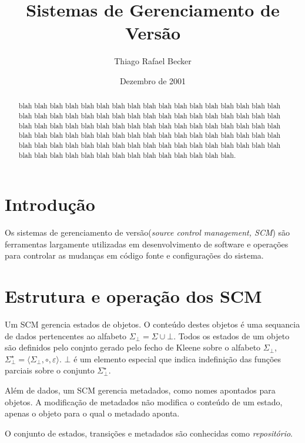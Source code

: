 \documentclass[a4paper]{article}
\title{Sistemas de Gerenciamento de Versão}
\author{Thiago Rafael Becker}
\date{Dezembro de 2001}
\newcommand{\scm}{{sistemas de gerenciamento de versão}}
\newcommand{\baseset}{{\Sigma^\star_\bot}}
\newcommand{\composition}{{\circ}}
\begin{document}
\maketitle
\begin{abstract}
blah blah blah blah blah blah blah blah blah blah blah blah blah blah blah blah
blah blah blah blah blah blah blah blah blah blah blah blah blah blah blah blah
blah blah blah blah blah blah blah blah blah blah blah blah blah blah blah blah
blah blah blah blah blah blah blah blah blah blah blah blah blah blah blah blah
blah blah blah blah blah blah blah blah blah blah blah blah blah blah blah blah
blah blah blah blah blah blah blah blah blah blah blah blah blah blah blah blah
blah blah blah.
\end{abstract}

\section*{Introdução}
Os \scm ({\it source control management, SCM}) são ferramentas largamente
utilizadas em desenvolvimento de software e operações para controlar as mudanças
em código fonte e configurações do sistema. 

\section*{Estrutura e operação dos SCM} \label{sec:intuitiva}
Um SCM gerencia estados de objetos. O conteúdo destes objetos é uma sequancia de dados pertencentes ao alfabeto $\Sigma_\bot = \Sigma \cup \bot$. Todos os estados de um objeto são definidos pelo conjnto gerado pelo fecho de Kleene sobre o alfabeto $\Sigma_\bot$, $\baseset = \langle\Sigma_\bot, \composition, \varepsilon\rangle$. $\bot$ é um elemento especial que indica indefinição das funções parciais sobre o conjunto $\baseset$.

Além de dados, um SCM gerencia metadados, como nomes apontados para objetos. A modificação de metadados não modifica o conteúdo de um estado, apenas o objeto para o qual o metadado aponta.

O conjunto de estados, transições e metadados são conhecidas como {\it repositório}.
\end{document}
